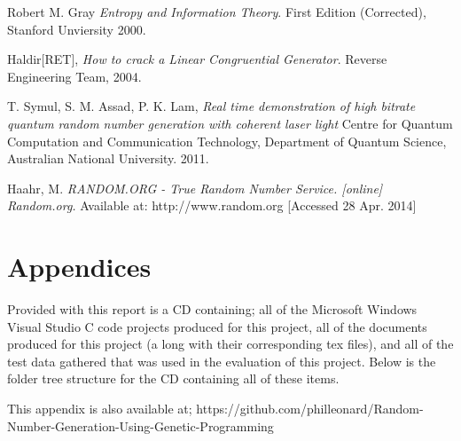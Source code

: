 \documentclass[a4paper,10.5pt]{article}
\begin{document}
\begin{thebibliography}{13}
  Robert M. Gray
  \emph{Entropy and Information Theory}.
  First Edition (Corrected),
  Stanford Unviersity
  2000.

  Haldir[RET],
  \emph{How to crack a Linear Congruential Generator}.
  Reverse Engineering Team,
  2004.

T. Symul, S. M. Assad, P. K. Lam,
\emph{Real time demonstration of high bitrate quantum random number generation
with coherent laser light}
Centre for Quantum Computation and Communication Technology, Department of Quantum Science,
Australian National University.
2011.

 Haahr, M. 
\emph{RANDOM.ORG - True Random Number Service. [online] Random.org.} 
Available at: http://www.random.org [Accessed 28 Apr. 2014]

\end{thebibliography}
\newpage
\section{Appendices}
Provided with this report is a CD containing; all of the Microsoft Windows Visual Studio C code projects produced for this project, all of the documents produced for this project (a long with their corresponding tex files), and all of the test data gathered that was used in the evaluation of this project. Below is the folder tree structure for the CD containing all of these items. 
\renewcommand*\DTstylecomment{\rmfamily\color{dblue}\textsc}
\renewcommand*\DTstyle{\ttfamily\textcolor{dred}}


This appendix is also available at; https://github.com/philleonard/Random-Number-Generation-Using-Genetic-Programming 
\end{document}
